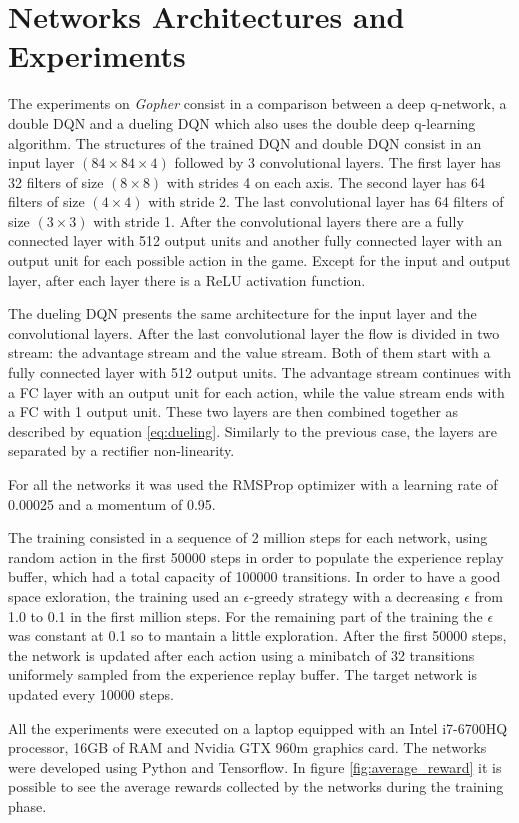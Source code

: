 \documentclass[article,11pt]{article}
\begin{document}
	
	\section{Networks Architectures and Experiments}
	The experiments on \textit{Gopher} consist in a comparison between a deep q-network, a double DQN and a dueling DQN which also uses the double deep q-learning algorithm. The structures of the trained DQN and double DQN consist in an input layer $(84\times84\times4)$ followed by 3 convolutional layers. The first layer has 32 filters of size $(8\times8)$ with strides 4 on each axis. The second layer has 64 filters of size $(4\times4)$ with stride 2. The last convolutional layer has 64 filters  of size $(3\times3)$ with stride 1. After the convolutional layers there are a fully connected layer with 512 output units and another fully connected layer with an output unit for each possible action in the game. Except for the input and output layer, after each layer there is a ReLU activation function.
	
	The dueling DQN presents the same architecture for the input layer and the convolutional layers. After the last convolutional layer the flow is divided in two stream: the advantage stream and the value stream. Both of them start with a fully connected layer with 512 output units. The advantage stream continues with a FC layer with an output unit for each action, while the value stream ends with a FC with 1 output unit. These two layers are then combined together as described by equation \ref{eq:dueling}. Similarly to the previous case, the layers are separated by a rectifier non-linearity.
	
	For all the networks it was used the RMSProp optimizer with a learning rate of 0.00025 and a momentum of 0.95.
	
	The training consisted in a sequence of 2 million steps for each network, using random action in the first 50000 steps in order to populate the experience replay buffer, which had a total capacity of 100000 transitions. In order to have a good space exloration, the training used an $\epsilon$-greedy strategy with a decreasing $\epsilon$ from 1.0 to 0.1 in the first million steps. For the remaining part of the training the $\epsilon$ was constant at 0.1 so to mantain a little exploration. After the first 50000 steps, the network is updated after each action using a minibatch of 32 transitions uniformely sampled from the experience replay buffer. The target network is updated every 10000 steps.
	
	All the experiments were executed on a laptop equipped with an Intel i7-6700HQ processor, 16GB of RAM and Nvidia GTX 960m graphics card. The networks were developed using Python and Tensorflow.	In figure \ref{fig:average_reward} it is possible to see the average rewards collected by the networks during the training phase.
	
\end{document}
